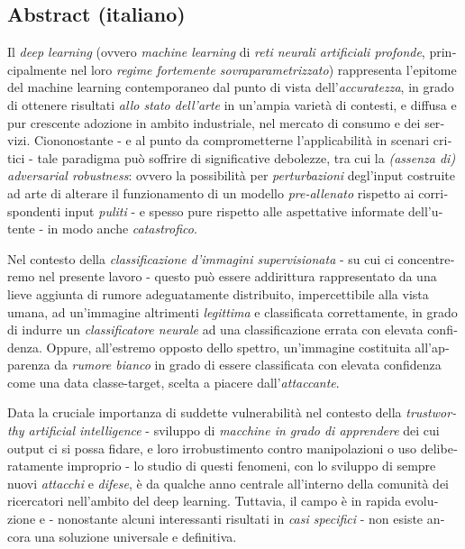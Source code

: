 
\begin{otherlanguage}{italian}

\newpage
\subsection{Abstract (italiano)}

Il \textit{deep learning} (ovvero \textit{machine learning} di \textit{reti neurali artificiali profonde}, principalmente nel loro \textit{regime fortemente sovraparametrizzato}) rappresenta l'epitome del machine learning contemporaneo dal punto di vista dell'\textit{accuratezza}, in grado di ottenere risultati \textit{allo stato dell'arte} in un'ampia varietà di contesti, e diffusa e pur crescente adozione in ambito industriale, nel mercato di consumo e dei servizi. Ciononostante - e al punto da comprometterne l'applicabilità in scenari critici - tale paradigma può soffrire di significative debolezze, tra cui la \textit{(assenza di)} \textit{adversarial robustness}: ovvero la possibilità per \textit{perturbazioni} degl'input costruite ad arte di alterare il funzionamento di un modello \textit{pre-allenato} rispetto ai corrispondenti input \textit{puliti} - e spesso pure rispetto alle aspettative informate dell'utente - in modo anche \textit{catastrofico}.

Nel contesto della \textit{classificazione d'immagini supervisionata} - su cui ci concentreremo nel presente lavoro - questo può essere addirittura rappresentato da una lieve aggiunta di rumore adeguatamente distribuito, impercettibile alla vista umana, ad un'immagine altrimenti \textit{legittima} e classificata correttamente, in grado di indurre un \textit{classificatore neurale} ad una classificazione errata con elevata confidenza. Oppure, all'estremo opposto dello spettro, un'immagine costituita all'apparenza da \textit{rumore bianco} in grado di essere classificata con elevata confidenza come una data classe-target, scelta a piacere dall'\textit{attaccante}.

Data la cruciale importanza di suddette vulnerabilità nel contesto della \textit{trustworthy artificial intelligence} - sviluppo di \textit{macchine in grado di apprendere} dei cui output ci si possa fidare, e loro irrobustimento contro manipolazioni o uso deliberatamente improprio - lo studio di questi fenomeni, con lo sviluppo di sempre nuovi \textit{attacchi} e \textit{difese}, è da qualche anno centrale all'interno della comunità dei ricercatori nell'ambito del deep learning. Tuttavia, il campo è in rapida evoluzione e - nonostante alcuni interessanti risultati in \textit{casi specifici} - non esiste ancora una soluzione universale e definitiva.


\end{otherlanguage}
